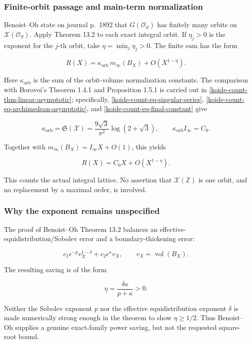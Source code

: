\subsubsection{Finite-orbit passage and main-term normalization}\label{koide-lit-finite-orbit-passage-and-main-term-normalization}

Benoist--Oh state on journal p.~1892 that \(G(\mathcal O_S)\) has finitely many orbits on \(\mathscr X(\mathcal O_S)\). Apply Theorem 13.2 to each exact integral orbit. If \(\eta_j>0\) is the exponent for the \(j\)-th orbit, take \(\eta=\min_j\eta_j>0\). The finite sum has the form

\[
 R(X)=\kappa_{\mathrm{orb}}\,m_\infty(B_X)+O(X^{1-\eta}).
\]

Here \(\kappa_{\mathrm{orb}}\) is the sum of the orbit-volume normalization
constants.  The comparison with Borovoi's Theorem 1.4.1 and Proposition
1.5.1 is carried out in
\cref{koide-count-thm-linear-asymptotic}; specifically,
\eqref{koide-count-eq-singular-series},
\eqref{koide-count-eq-archimedean-asymptotic}, and
\eqref{koide-count-eq-final-constant} give

\[
 \kappa_{\mathrm{orb}}=\mathfrak S(\mathscr X)
 =\frac{9\sqrt3}{\pi^2}\log(2+\sqrt3),
 \qquad
 \kappa_{\mathrm{orb}} I_\infty=C_0.
\]

Together with \(m_\infty(B_X)=I_\infty X+O(1)\), this yields

\[
 R(X)=C_0X+O(X^{1-\eta}).
\]

This counts the actual integral lattice. No assertion that \(\mathscr X(\mathbb Z)\) is one orbit, and no replacement by a maximal order, is involved.

\subsubsection{Why the exponent remains unspecified}\label{koide-lit-why-the-exponent-remains-unspecified}

The proof of Benoist--Oh Theorem 13.2 balances an effective-equidistribution/Sobolev error and a boundary-thickening error:

\[
 c_1\epsilon^{-p}v_X^{1-\delta}+c_2\epsilon^\kappa v_X,
 \qquad v_X=\operatorname{vol}(B_X).
\]

The resulting saving is of the form

\[
 \eta=\frac{\delta\kappa}{p+\kappa}>0.
\]

Neither the Sobolev exponent \(p\) nor the effective equidistribution exponent \(\delta\) is made numerically strong enough in the theorem to show \(\eta\geq1/2\). Thus Benoist--Oh supplies a genuine exact-family power saving, but not the requested square-root bound.

